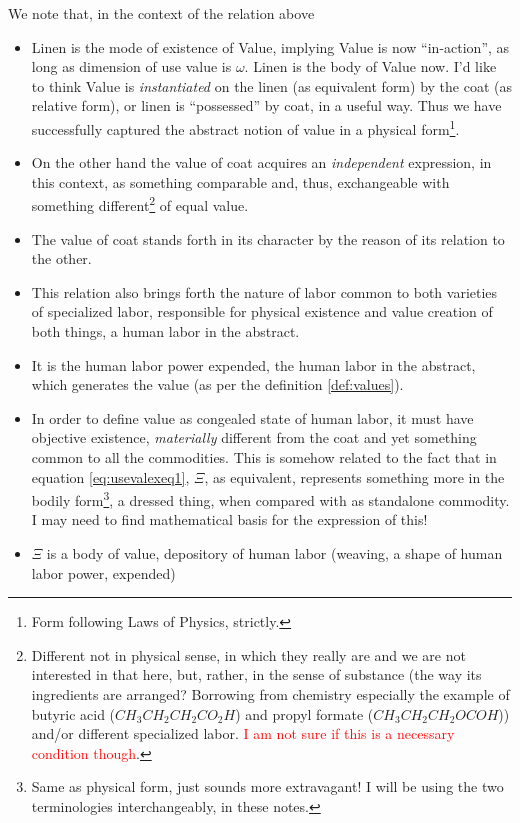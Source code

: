 \documentclass[12pt]{extarticle}
\theoremstyle{definition}
\newenvironment{remark}[1][Remark]{\begin{trivlist}
\item[\hskip \labelsep {\bfseries #1}]}{\end{trivlist}}
\begin{document}
\begin{remark}
  \label{rem:relform}
  We note that, in the context of the relation above
  \begin{itemize}
  \item Linen is the mode of existence of Value, implying Value is now ``in-action'', as long as dimension of use value is $\omega$.  Linen is the body of Value now.  I'd like to think Value is \emph{instantiated} on the linen (as equivalent form) by the coat (as relative form), or linen is ``possessed'' by coat, in a useful way.   Thus we have successfully captured the abstract notion of value in a physical form\footnote{Form following Laws of Physics, strictly.}.
  \item On the other hand the value of coat acquires an \emph{independent} expression, in this context, as something comparable and, thus, exchangeable with something different\footnote{Different not in physical sense, in which they really are and we are not interested in that here, but, rather, in the sense of substance (the way its ingredients are arranged?  Borrowing from chemistry especially the example of butyric acid ($CH_3CH_2CH_2CO_2H$) and propyl formate ($CH_3CH_2CH_2OCOH$)) and/or different specialized labor.  \textcolor{red}{I am not sure if this is a necessary condition though}.} of equal value.
  \item The value of coat stands forth in its character by the reason of its relation to the other.
  \item This relation also brings forth the nature of labor common to both varieties of specialized labor, responsible for physical existence and value creation of both things, a human labor in the abstract.
    \item It is the human labor power expended, the human labor in the abstract, which generates the value (as per the definition \ref{def:values}).
    \item In order to define value as congealed state of human labor, it must have objective existence, \emph{materially} different from the coat and yet something common to all the commodities.  This is somehow related to the fact that in equation \ref{eq:usevalexeq1}, $\Xi$, as equivalent, represents something more in the bodily form\footnote{Same as physical form, just sounds more extravagant!  I will be using the two terminologies interchangeably, in these notes.}, a dressed thing, when compared with as standalone commodity.  I may need to find mathematical basis for the expression of this!
    \item $\Xi$ is a body of value, depository of human labor (weaving, a shape of human labor power, expended)

\end{itemize}
\end{remark}
\end{document}
